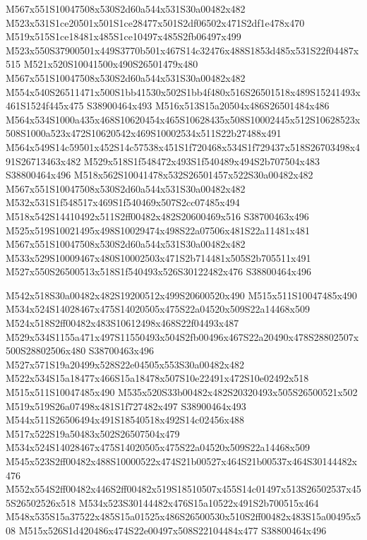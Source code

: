 \documentclass{article}
\begin{document}
\begin{multicols}{2}
M567x551S10047508x530S2d60a544x531S30a00482x482 M523x531S1ce20501x501S1ce28477x501S2df06502x471S2df1e478x470 M519x515S1ce18481x485S1ce10497x485S2fb06497x499 M523x550S37900501x449S3770b501x467S14c32476x488S1853d485x531S22f04487x515 M521x520S10041500x490S26501479x480 M567x551S10047508x530S2d60a544x531S30a00482x482 M554x540S26511471x500S1bb41530x502S1bb4f480x516S26501518x489S15241493x461S1524f445x475 S38900464x493 M516x513S15a20504x486S26501484x486 M564x534S1000a435x468S10620454x465S10628435x508S10002445x512S10628523x508S1000a523x472S10620542x469S10002534x511S22b27488x491 M564x549S14c59501x452S14c57538x451S1f720468x534S1f729437x518S26703498x491S26713463x482 M529x518S1f548472x493S1f540489x494S2b707504x483 S38800464x496 M518x562S10041478x532S26501457x522S30a00482x482 M567x551S10047508x530S2d60a544x531S30a00482x482 M532x531S1f548517x469S1f540469x507S2cc07485x494 M518x542S14410492x511S2ff00482x482S20600469x516 S38700463x496 M525x519S10021495x498S10029474x498S22a07506x481S22a11481x481 M567x551S10047508x530S2d60a544x531S30a00482x482 M533x529S10009467x480S10002503x471S2b714481x505S2b705511x491 M527x550S26500513x518S1f540493x526S30122482x476 S38800464x496

M542x518S30a00482x482S19200512x499S20600520x490 M515x511S10047485x490 M534x524S14028467x475S14020505x475S22a04520x509S22a14468x509 M524x518S2ff00482x483S10612498x468S22f04493x487 M529x534S1155a471x497S11550493x504S2fb00496x467S22a20490x478S28802507x500S28802506x480 S38700463x496 M527x571S19a20499x528S22e04505x553S30a00482x482 M522x534S15a18477x466S15a18478x507S10e22491x472S10e02492x518 M515x511S10047485x490 M535x520S33b00482x482S20320493x505S26500521x502 M519x519S26a07498x481S1f727482x497 S38900464x493 M544x511S26506494x491S18540518x492S14c02456x488 M517x522S19a50483x502S26507504x479 M534x524S14028467x475S14020505x475S22a04520x509S22a14468x509 M545x523S2ff00482x488S10000522x474S21b00527x464S21b00537x464S30144482x476 M552x554S2ff00482x446S2ff00482x519S18510507x455S14c01497x513S26502537x455S26502526x518 M534x523S30144482x476S15a10522x491S2b700515x464 M548x535S15a37522x485S15a01525x486S26500530x510S2ff00482x483S15a00495x508 M515x526S1d420486x474S22e00497x508S22104484x477 S38800464x496


\end{multicols}
\end{document}
